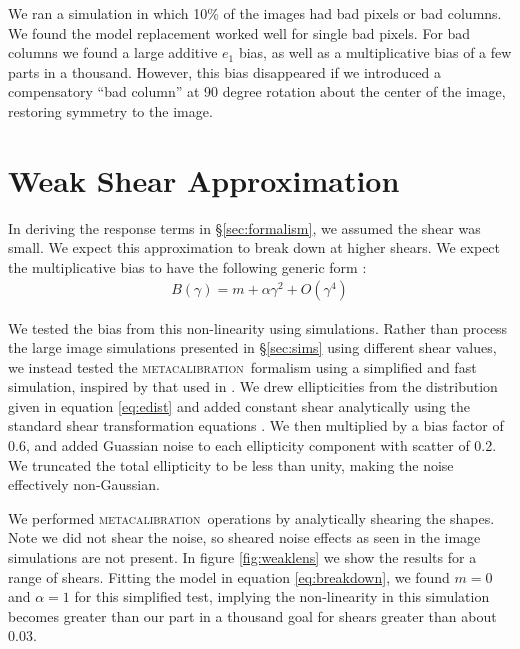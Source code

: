 \documentclass[iop]{emulateapj}
\newcommand{\mcal}{\textsc{metacalibration}}
\begin{document}
We ran a simulation in which 10\% of the images had bad pixels or bad columns.
We found the model replacement worked well for single bad pixels. For bad
columns we found a large additive $e_1$ bias, as well as a multiplicative bias
of a few parts in a thousand.  However, this bias disappeared if we introduced
a compensatory ``bad column'' at 90 degree rotation about the center of the
image, restoring symmetry to the image. 

\section{Weak Shear Approximation}

In deriving the response terms in \S \ref{sec:formalism}, we assumed the shear
was small. We expect this approximation to break down at higher shears.  We
expect the multiplicative bias to have the following generic form \citep{bfd2016}:
\begin{align} \label{eq:breakdown}
	B(\gamma) = m + \alpha \gamma^2 + O(\gamma^4)
\end{align}


We tested the bias from this non-linearity using simulations.
Rather than process the large image simulations presented in \S \ref{sec:sims} using
different shear values, we instead tested the \mcal\ formalism using a
simplified and fast simulation, inspired by that used in \citep{ba14}.  We drew
ellipticities from the distribution given in equation \ref{eq:edist} and added
constant shear analytically using the standard shear transformation equations
\citep{SeitzSchneider97}.  We then multiplied by a bias factor of 0.6, and
added Guassian noise to each ellipticity component with scatter of 0.2. We
truncated the total ellipticity to be less than unity, making the noise
effectively non-Gaussian.

We performed \mcal\ operations by analytically shearing the shapes.  Note we
did not shear the noise, so sheared noise effects as seen in the image
simulations are not present.  In figure \ref{fig:weaklens} we show the results
for a range of shears.  Fitting the model in equation \ref{eq:breakdown}, we
found $m=0$ and $\alpha=1$ for this simplified test, implying  the
non-linearity in this simulation becomes greater than our part in a thousand
goal for shears greater than about 0.03.
\end{document}
